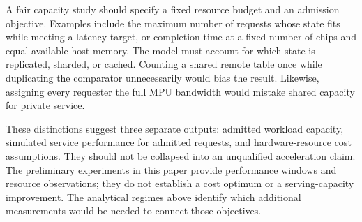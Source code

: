 A fair capacity study should specify a fixed resource budget and an admission objective. Examples include the maximum number of requests whose state fits while meeting a latency target, or completion time at a fixed number of chips and equal available host memory. The model must account for which state is replicated, sharded, or cached. Counting a shared remote table once while duplicating the comparator unnecessarily would bias the result. Likewise, assigning every requester the full MPU bandwidth would mistake shared capacity for private service.

These distinctions suggest three separate outputs: admitted workload capacity, simulated service performance for admitted requests, and hardware-resource cost assumptions. They should not be collapsed into an unqualified acceleration claim. The preliminary experiments in this paper provide performance windows and resource observations; they do not establish a cost optimum or a serving-capacity improvement. The analytical regimes above identify which additional measurements would be needed to connect those objectives.
